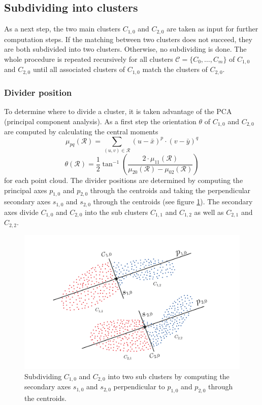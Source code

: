 \documentclass[notitlepage,english]{hgbreport}
\begin{document}
	\subsection{Subdividing into clusters}
	
	As a next step, the two main clusters $C_{1,0}$ and $C_{2,0}$ are taken as input for further computation steps. If the matching between two clusters does not succeed, they are both subdivided into two clusters. Otherwise, no subdividing is done. The whole procedure is repeated recursively for all clusters $\mathcal{C} = \{C_0, \ldots, C_m\}$ of $C_{1,0}$ and $C_{2,0}$ until all associated clusters of $C_{1,0}$ match the clusters of $C_{2,0}$.  
	
	\subsubsection{Divider position}
	
	To determine where to divide a cluster, it is taken advantage of the PCA (principal component analysis). As a first step the orientation $\theta$ of $C_{1,0}$ and $C_{2,0}$ are computed by calculating the central moments
	\begin{equation}
	\mu_{pq}(\mathcal{R}) = \sum_{(u,v)\in\mathcal{R}} (u - \bar{x})^p \cdot (v - \bar{y})^q
	\end{equation}
	\begin{equation}
	\theta(\mathcal{R}) = \frac{1}{2} \tan^{-1} \left(\frac{2\cdot \mu_{11}(\mathcal{R})}{\mu_{20}(\mathcal{R}) - \mu_{02}(\mathcal{R})}\right)
	\end{equation}
	for each point cloud.	
	The divider positions are determined by computing the principal axes $p_{1,0}$ and $p_{2,0}$ through the centroids and taking the perpendicular secondary axes $s_{1,0}$ and $s_{2,0}$ through the centroids (see figure \ref{fig:dc_axes_2p}). The secondary axes divide $C_{1,0}$ and $C_{2,0}$ into the sub clusters $C_{1,1}$ and $C_{1,2}$ as well as $C_{2,1}$ and $C_{2,2}$.
	
	\begin{figure}
		\centering
		\includegraphics[width=0.8\linewidth]{illustration_axes}
		\caption{Subdividing $C_{1,0}$ and $C_{2,0}$ into two sub clusters by computing the secondary axes $s_{1,0}$ and $s_{2,0}$ perpendicular to $p_{1,0}$ and $p_{2,0}$ through the centroids.}
		\label{fig:dc_axes_2p}
	\end{figure}
	
\end{document}
